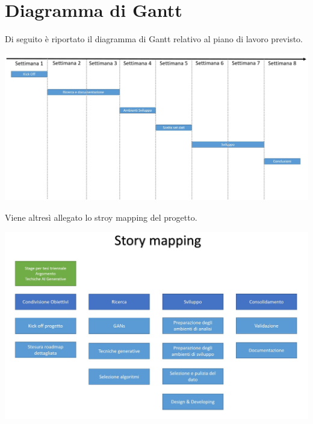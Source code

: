 \section*{Diagramma di Gantt}
Di seguito è riportato il diagramma di Gantt relativo al piano di lavoro previsto.
\begin{center}
	\includegraphics[width=18cm]{img/GANTT.JPG}
\end{center}
Viene altresì allegato lo stroy mapping del progetto.
\begin{center}
	\includegraphics[width=18cm]{img/Story_Mapping.JPG}
\end{center}